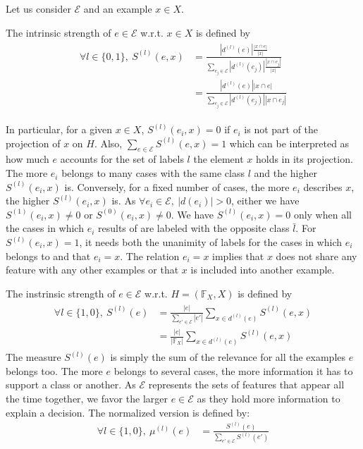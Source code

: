 \documentclass[sigconf,edbt]{acmart-edbt-workshops}
\newcommand{\mynote}[1]{{\bf  \textcolor{blue}{#1}}}
\begin{document}
Let us consider $\mathcal E$ and an example $x \in X$.
\begin{definition}
  The intrinsic strength of $e \in \mathcal E$ w.r.t. $x \in X$ is defined by \begin{align}
    \begin{split}
    \forall l \in \{ 0, 1\}, ~ S^{(l)}(e, x) & = \frac{|d^{(l)}(e)| \frac{|x \cap e|}{|x|}}{\underset{e_j \in \mathcal E}{\sum}|d^{(l)}(e_j)|  \frac{|x \cap e_j|}{|x|}} \\
    & = \frac{|d^{(l)}(e)|  |x \cap e|}{\underset{e_j \in \mathcal E}{\sum}|d^{(l)}(e_j)| |x \cap e_j|}
    \end{split}
    \end{align}
\end{definition}
\noindent
In particular, for a given $x \in X$, $S^{(l)}(e_i, x) =0$ if $e_i$ is not part of the projection of $x$ on $H$. Also, $\underset{e \in \mathcal E}{\sum} S^{(l)}(e, x) = 1$ which can be interpreted as how much $e$ accounts for the set of labels $l$ the element $x$ holds in its projection.
The more $e_i$ belongs to many cases with the same class $l$ and the higher $S^{(l)}(e_i, x)$ is. Conversely, for a fixed number of cases, the more $e_i$ describes $x$, the higher $S^{(l)}(e_i, x)$ is. As $\forall e_i \in \mathcal E, ~ |d(e_i)| > 0$, either we have $S^{(1)}(e_i, x) \neq 0$ or $S^{(0)}(e_i, x) \neq 0$. We have $S^{(l)}(e_i, x) = 0$ only when all the cases in which $e_i$ results of are labeled with the opposite class $\bar l$. For $S^{(l)}(e_i, x) = 1$, it needs both the unanimity of labels for the cases in which $e_i$ belongs to and that $e_i = x$. The relation $e_i = x$ implies that $x$ does not share any feature with any other examples or that $x$ is included into another example.
\begin{definition}
  \label{intrinsic_strength}
  The instrinsic strength of $e \in \mathcal{E}$ w.r.t. $H = (\mathbb{F}_X, X)$ is defined by
  \begin{align}
  \begin{split}
  \forall l \in \{ 1, 0 \}, ~ S^{(l)}(e) & = \frac{|e|}{ \underset{e' \in \mathcal{E}}{\sum} |e'|} \underset{x \in d^{(l)}(e)}{\sum} S^{(l)}(e, x) \\
  & = \frac{|e|}{|\mathbb{F}_X|} \underset{x \in d^{(l)}(e)}{\sum} S^{(l)}(e, x)
   \end{split}
  \end{align} The measure $S^{(l)}(e)$ is simply the sum of the relevance for all the examples $e$ belongs too. The more $e$ belongs to several cases, the more information it has to support a class or another. As $\mathcal E$ represents the sets of features that appear all the time together, we favor the larger $e \in \mathcal E$ as they hold more information to explain a decision.
  The normalized version is defined by:
    \begin{align}
  \forall l \in \{ 1, 0 \},~ \mu^{(l)}(e) & = \frac{S^{(l)}(e)}{ \underset{e' \in \mathcal{E}}{\sum} S^{(l)}(e')}
  \end{align}
\end{definition} 
\end{document}
